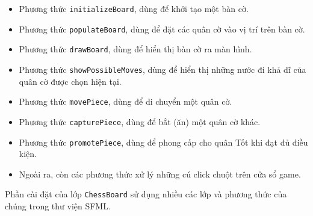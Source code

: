 \begin{itemize}
 \item Phương thức \lstinline{initializeBoard}, dùng để khởi tạo một bàn cờ.
 \item Phương thức \lstinline{populateBoard}, dùng để đặt các quân cờ vào vị trí trên bàn cờ.
  \item Phương thức \lstinline{drawBoard}, dùng để hiển thị bàn cờ ra màn hình.
  \item Phương thức \lstinline{showPossibleMoves}, dùng để hiển thị những nước đi khả dĩ của quân cờ được chọn hiện tại.
  \item Phương thức \lstinline{movePiece}, dùng để di chuyển một quân cờ.
  \item Phương thức \lstinline{capturePiece}, dùng để bắt (ăn) một quân cờ khác.
  \item Phương thức \lstinline{promotePiece}, dùng để phong cấp cho quân Tốt khi đạt đủ điều kiện.
  \item Ngoài ra, còn các phương thức xử lý những cú click chuột trên cửa sổ game.
\end{itemize} 
Phần cài đặt của lớp \lstinline{ChessBoard} sử dụng nhiều các lớp và phương thức của chúng trong thư viện SFML.